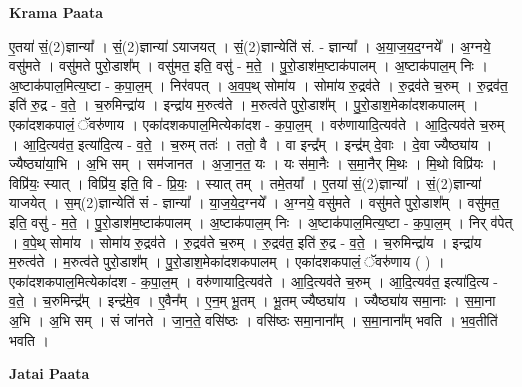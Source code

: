 \documentclass[17pt]{extarticle}
\begin{document}
\textbf{Krama Paata} \newline

ए॒तया॑ सं॒(2)ज्ञान्या᳚ । सं॒(2)ज्ञान्या॑ ऽयाजयत् । सं॒(2)ज्ञान्येति॑ सं. - ज्ञान्या᳚ । अ॒या॒ज॒य॒द॒ग्नये᳚ । अ॒ग्नये॒ वसु॑मते । वसु॑मते पुरो॒डाश᳚म् । वसु॑मत॒ इति॒ वसु॑ - म॒ते॒ । पु॒रो॒डाश॑म॒ष्टाक॑पालम् । अ॒ष्टाक॑पाल॒म् निः । अ॒ष्टाक॑पाल॒मित्य॒ष्टा - क॒पा॒ल॒म् । निर॑वपत् । अ॒व॒प॒थ् सोमा॑य । सोमा॑य रु॒द्रव॑ते । रु॒द्रव॑ते च॒रुम् । रु॒द्रव॑त॒ इति॑ रु॒द्र - व॒ते॒ । च॒रुमिन्द्रा॑य । इन्द्रा॑य म॒रुत्व॑ते । म॒रुत्व॑ते पुरो॒डाश᳚म् । पु॒रो॒डाश॒मेका॑दशकपालम् । एका॑दशकपालं॒ ॅवरु॑णाय । एका॑दशकपाल॒मित्येका॑दश - क॒पा॒ल॒म् । वरु॑णायादि॒त्यव॑ते । आ॒दि॒त्यव॑ते च॒रुम् । आ॒दि॒त्यव॑त॒ इत्या॑दि॒त्य - व॒ते॒ । च॒रुम् ततः॑ । ततो॒ वै । वा इन्द्र᳚म् । इन्द्र॑म् दे॒वाः । दे॒वा ज्यैष्ठ्या॑य । ज्यैष्ठ्या॑या॒भि । अ॒भि सम् । सम॑जानत । अ॒जा॒न॒त॒ यः । यः स॑मा॒नैः । स॒मा॒नैर् मि॒थः । मि॒थो विप्रि॑यः । विप्रि॑यः॒ स्यात् । विप्रि॑य॒ इति॒ वि - प्रि॒यः॒ । स्यात् तम् । तमे॒तया᳚ । ए॒तया॑ 
सं॒(2)ज्ञान्या᳚ । सं॒(2)ज्ञान्या॑ याजयेत् । स॒म्(2)ज्ञान्येति॑ सं - ज्ञान्या᳚ । या॒ज॒ये॒द॒ग्नये᳚ । अ॒ग्नये॒ वसु॑मते । वसु॑मते पुरो॒डाश᳚म् । वसु॑मत॒ इति॒ वसु॑ - म॒ते॒ । पु॒रो॒डाश॑म॒ष्टाक॑पालम् । अ॒ष्टाक॑पाल॒म् निः । अ॒ष्टाक॑पाल॒मित्य॒ष्टा - क॒पा॒ल॒म् । निर् व॑पेत् । व॒पे॒थ् सोमा॑य । सोमा॑य रु॒द्रव॑ते । रु॒द्रव॑ते च॒रुम् । रु॒द्रव॑त॒ इति॑ रु॒द्र - व॒ते॒ । च॒रुमिन्द्रा॑य । इन्द्रा॑य म॒रुत्व॑ते । म॒रुत्व॑ते पुरो॒डाश᳚म् । पु॒रो॒डाश॒मेका॑दशकपालम् । एका॑दशकपालं॒ ॅवरु॑णाय ( ) । एका॑दशकपाल॒मित्येका॑दश - क॒पा॒ल॒म् । वरु॑णायादि॒त्यव॑ते । आ॒दि॒त्यव॑ते च॒रुम् । आ॒दि॒त्यव॑त॒ इत्या॑दि॒त्य - व॒ते॒ । च॒रुमिन्द्र᳚म् । इन्द्र॑मे॒व । ए॒वैन᳚म् । ए॒न॒म् भू॒तम् । भू॒तम् ज्यैष्ठ्या॑य । ज्यैष्ठ्या॑य समा॒नाः । स॒मा॒ना अ॒भि । अ॒भि सम् । सं जा॑नते । जा॒न॒ते॒ वसि॑ष्ठः । वसि॑ष्ठः समा॒नाना᳚म् । स॒मा॒नाना᳚म् भवति । भ॒व॒तीति॑ भवति । \newline

\textbf{Jatai Paata} \newline
\end{document}
